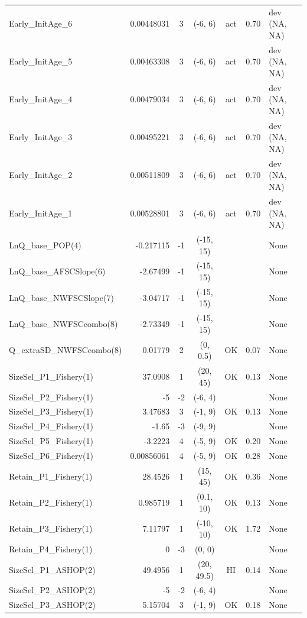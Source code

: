 \documentclass[12pt,]{article}
\begin{document}
\begin{landscape}
\begin{longtable}{lrcccll}
  Early\_InitAge\_6 & 0.00448031 & 3 & (-6, 6) & act & 0.70 & dev (NA, NA) \\ 
  Early\_InitAge\_5 & 0.00463308 & 3 & (-6, 6) & act & 0.70 & dev (NA, NA) \\ 
  Early\_InitAge\_4 & 0.00479034 & 3 & (-6, 6) & act & 0.70 & dev (NA, NA) \\ 
  Early\_InitAge\_3 & 0.00495221 & 3 & (-6, 6) & act & 0.70 & dev (NA, NA) \\ 
  Early\_InitAge\_2 & 0.00511809 & 3 & (-6, 6) & act & 0.70 & dev (NA, NA) \\ 
  Early\_InitAge\_1 & 0.00528801 & 3 & (-6, 6) & act & 0.70 & dev (NA, NA) \\ 
  LnQ\_base\_POP(4) & -0.217115 & -1 & (-15, 15) &  &  & None \\ 
  LnQ\_base\_AFSCSlope(6) & -2.67499 & -1 & (-15, 15) &  &  & None \\ 
  LnQ\_base\_NWFSCSlope(7) & -3.04717 & -1 & (-15, 15) &  &  & None \\ 
  LnQ\_base\_NWFSCcombo(8) & -2.73349 & -1 & (-15, 15) &  &  & None \\ 
  Q\_extraSD\_NWFSCcombo(8) & 0.01779 & 2 & (0, 0.5) & OK & 0.07 & None \\ 
  SizeSel\_P1\_Fishery(1) & 37.0908 & 1 & (20, 45) & OK & 0.13 & None \\ 
  SizeSel\_P2\_Fishery(1) & -5 & -2 & (-6, 4) &  &  & None \\ 
  SizeSel\_P3\_Fishery(1) & 3.47683 & 3 & (-1, 9) & OK & 0.13 & None \\ 
  SizeSel\_P4\_Fishery(1) & -1.65 & -3 & (-9, 9) &  &  & None \\ 
  SizeSel\_P5\_Fishery(1) & -3.2223 & 4 & (-5, 9) & OK & 0.20 & None \\ 
  SizeSel\_P6\_Fishery(1) & 0.00856061 & 4 & (-5, 9) & OK & 0.28 & None \\ 
  Retain\_P1\_Fishery(1) & 28.4526 & 1 & (15, 45) & OK & 0.36 & None \\ 
  Retain\_P2\_Fishery(1) & 0.985719 & 1 & (0.1, 10) & OK & 0.13 & None \\ 
  Retain\_P3\_Fishery(1) & 7.11797 & 1 & (-10, 10) & OK & 1.72 & None \\ 
  Retain\_P4\_Fishery(1) & 0 & -3 & (0, 0) &  &  & None \\ 
  SizeSel\_P1\_ASHOP(2) & 49.4956 & 1 & (20, 49.5) & HI & 0.14 & None \\ 
  SizeSel\_P2\_ASHOP(2) & -5 & -2 & (-6, 4) &  &  & None \\ 
  SizeSel\_P3\_ASHOP(2) & 5.15704 & 3 & (-1, 9) & OK & 0.18 & None \\ 

\end{longtable}
\end{landscape}
\end{document}
